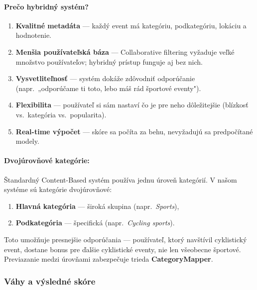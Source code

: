   \paragraph{Prečo hybridný systém?}
  \begin{enumerate}
      \item \textbf{Kvalitné metadáta} — každý event má kategóriu,
            podkategóriu, lokáciu a hodnotenie.
      \item \textbf{Menšia používateľská báza} — Collaborative filtering
            vyžaduje veľké množstvo používateľov; hybridný prístup funguje
            aj bez nich.
      \item \textbf{Vysvetliteľnosť} — systém dokáže zdôvodniť odporúčanie
            (napr.\ „odporúčame ti toto, lebo máš rád športové eventy").
      \item \textbf{Flexibilita} — používateľ si sám nastaví čo je pre neho
            dôležitejšie (blízkosť vs.\ kategória vs.\ popularita).
      \item \textbf{Real-time výpočet} — skóre sa počíta za behu,
            nevyžadujú sa predpočítané modely.
  \end{enumerate}

  \paragraph{Dvojúrovňové kategórie:}
  Štandardný Content-Based systém používa jednu úroveň kategórií.
  V našom systéme sú kategórie dvojúrovňové:
  \begin{enumerate}
      \item \textbf{Hlavná kategória} — široká skupina (napr.\ \textit{Sports}),
      \item \textbf{Podkategória} — špecifická (napr.\ \textit{Cycling sports}).
  \end{enumerate}

  Toto umožňuje presnejšie odporúčania — používateľ, ktorý navštívil
  cyklistický event, dostane bonus pre ďalšie cyklistické eventy, nie len
  všeobecne športové. Previazanie medzi úrovňami zabezpečuje trieda
  \textbf{CategoryMapper}.

  \subsubsection{Váhy a výsledné skóre}

